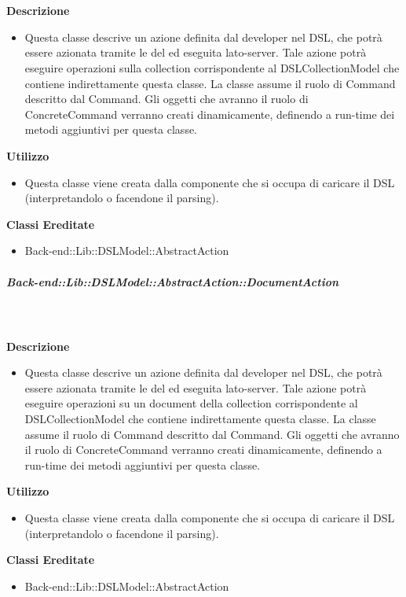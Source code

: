        \textbf{\\ \\ Descrizione} 
          \begin{itemize}
            \item[] Questa classe descrive un azione definita dal developer nel DSL, che potrà essere azionata tramite le  del  ed eseguita lato-server. Tale azione potrà eseguire operazioni sulla collection corrispondente al DSLCollectionModel che contiene indirettamente questa classe. La classe assume il ruolo di Command descritto dal  Command. Gli oggetti che avranno il ruolo di ConcreteCommand verranno creati dinamicamente, definendo a run-time dei metodi aggiuntivi per questa classe.
          \end{itemize}      
        \textbf{Utilizzo}  
          \begin{itemize}
            \item[] Questa classe viene creata dalla componente che si occupa di caricare il DSL (interpretandolo o facendone il parsing).
          \end{itemize}
          \textbf{Classi Ereditate}
          \begin{itemize}
                \item{Back-end::Lib::DSLModel::AbstractAction}
          \end{itemize}
      \subparagraph{Back-end::Lib::DSLModel::AbstractAction::DocumentAction}
        
        \textbf{\\ \\ Descrizione} 
          \begin{itemize}
            \item[] Questa classe descrive un azione definita dal developer nel DSL, che potrà essere azionata tramite le  del  ed eseguita lato-server. Tale azione potrà eseguire operazioni su un document della collection corrispondente al DSLCollectionModel che contiene indirettamente questa classe. La classe assume il ruolo di Command descritto dal  Command. Gli oggetti che avranno il ruolo di ConcreteCommand verranno creati dinamicamente, definendo a run-time dei metodi aggiuntivi per questa classe.
          \end{itemize}      
        \textbf{Utilizzo}  
          \begin{itemize}
            \item[] Questa classe viene creata dalla componente che si occupa di caricare il DSL (interpretandolo o facendone il parsing). 
          \end{itemize}
          \textbf{Classi Ereditate}
          \begin{itemize}
                \item{Back-end::Lib::DSLModel::AbstractAction}
          \end{itemize}
  
